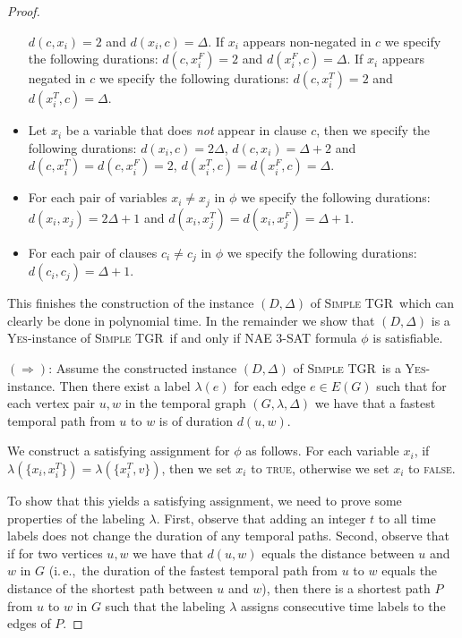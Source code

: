 \documentclass[a4paper,UKenglish,cleveref, autoref, thm-restate]{lipics-v2021}
\newcommand{\ie}{i.\,e.,\ }
\newcommand{\deltaExact}{\textsc{Simple TGR}}
\begin{document}
\begin{proof}
\begin{itemize}
    $d(c,x_i)=2$ and $d(x_i,c)=\Delta$.
    If $x_i$ appears non-negated in $c$ we specify the following durations:
    $d(c,x_i^F)=2$ and $d(x_i^F,c)=\Delta$.
    If $x_i$ appears negated in $c$ we specify the following durations:
    $d(c,x_i^T)=2$ and $d(x_i^T,c)=\Delta$.
    \item Let $x_i$ be a variable that does \emph{not} appear in clause $c$, then we specify the following durations:
    $d(x_i,c)=2 \Delta$, $d(c,x_i)=\Delta + 2$
    and
    $d(c,x_i^T)=d(c,x_i^F)=2$, $d(x_i^T,c)=d(x_i^F,c)=\Delta$. 
    \item For each pair of variables $x_i \neq x_j$ in $\phi$ we specify the following durations:
    $d(x_i,x_j)=2\Delta +1$ and
    $d(x_i,x_j^T)=d(x_i,x_j^F)=\Delta + 1$.
    \item For each pair of clauses $c_i \neq c_j$ in $\phi$ we specify the following durations:
    $d(c_i,c_j)= \Delta + 1$.
\end{itemize}
This finishes the construction of the instance $(D,\Delta)$ of \deltaExact\, which can clearly be done in polynomial time. In the remainder we show that $(D,\Delta)$ is a \textsc{Yes}-instance of \deltaExact\ if and only if NAE 3-SAT formula $\phi$ is satisfiable.

$(\Rightarrow)$: Assume the constructed instance $(D,\Delta)$ of \deltaExact\ is a \textsc{Yes}-instance. 
Then there exist a label $\lambda(e)$ for each edge $e\in E(G)$ such that for each vertex pair $u,w$ in the temporal graph $(G,\lambda,\Delta)$ we have that a fastest temporal path from $u$ to $w$ is of duration $d(u,w)$. 

We construct a satisfying assignment for $\phi$ as follows. For each variable $x_i$, 
if $\lambda(\{x_i, x_i^T\})=\lambda(\{x_i^T, v\})$, then we set $x_i$ to \textsc{true}, otherwise we set $x_i$ to \textsc{false}.

To show that this yields a satisfying assignment, we need to prove some properties of the labeling $\lambda$.
First, observe that adding an integer $t$ to all time labels does not change the duration of any temporal paths. 
Second, observe that if for two vertices $u,w$ we have that $d(u,w)$ equals the distance between $u$ and $w$ in $G$
(\ie the duration of the fastest temporal path from $u$ to $w$ equals the distance of the shortest path between $u$ and $w$), 
then there is a shortest path $P$ from $u$ to $w$ in $G$ such that 
the labeling $\lambda$ assigns consecutive time labels to the edges of $P$.



\end{proof}
\end{document}
